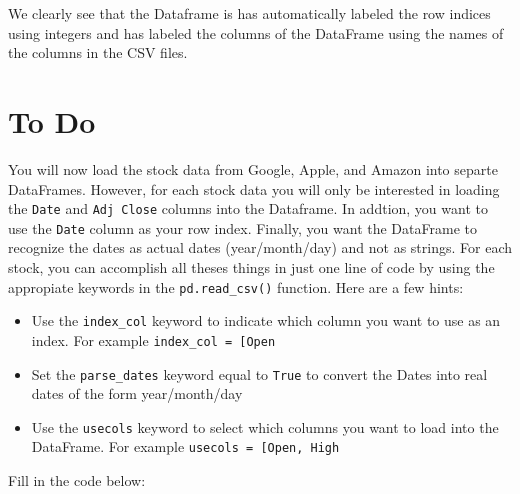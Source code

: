 \documentclass[11pt]{article}
\begin{document}
    We clearly see that the Dataframe is has automatically labeled the row
indices using integers and has labeled the columns of the DataFrame
using the names of the columns in the CSV files.

\section{To Do}\label{to-do}

You will now load the stock data from Google, Apple, and Amazon into
separte DataFrames. However, for each stock data you will only be
interested in loading the \texttt{Date} and \texttt{Adj\ Close} columns
into the Dataframe. In addtion, you want to use the \texttt{Date} column
as your row index. Finally, you want the DataFrame to recognize the
dates as actual dates (year/month/day) and not as strings. For each
stock, you can accomplish all theses things in just one line of code by
using the appropiate keywords in the \texttt{pd.read\_csv()} function.
Here are a few hints:

\begin{itemize}
\item
  Use the \texttt{index\_col} keyword to indicate which column you want
  to use as an index. For example
  \texttt{index\_col\ =\ {[}\textquotesingle{}Open\textquotesingle{}{]}}
\item
  Set the \texttt{parse\_dates} keyword equal to \texttt{True} to
  convert the Dates into real dates of the form year/month/day
\item
  Use the \texttt{usecols} keyword to select which columns you want to
  load into the DataFrame. For example
  \texttt{usecols\ =\ {[}\textquotesingle{}Open\textquotesingle{},\ \textquotesingle{}High\textquotesingle{}{]}}
\end{itemize}

Fill in the code below:
\end{document}
